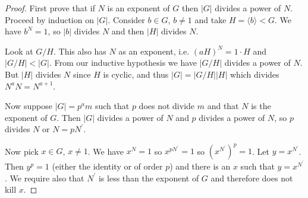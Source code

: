 \documentclass{article}
\begin{document}
\begin{proof}
First prove that if $N$ is an exponent of $G$ then $|G|$ divides a
power of $N$. Proceed by induction on $|G|$. Consider $b \in G$, $b
\neq 1$ and take $H = \langle b \rangle < G$. We have $b^N = 1$, so
$|b|$ divides $N$ and then $|H|$ divides $N$.

Look at $G / H$. This also has $N$ as an exponent, i.e.
$(aH)^N = 1 \cdot H$ and $|G / H| < |G|$. From our inductive
hypothesis we have $|G / H|$ divides a power of $N$. But
$|H|$ divides $N$ since $H$ is cyclic, and thus
$|G| = |G / H| |H|$ which divides $N^a N = N^{a+1}$.

Now suppose $|G| = p^a m$ such that $p$ does not divide $m$
and that $N$ is the exponent of $G$. Then $|G|$ divides a power of $N$
and $p$ divides a power of $N$, so $p$ divides $N$ or $N = p
N^\prime$.

Now pick $x \in G$, $x \neq 1$. We have $x^N = 1$ so $x^{pN^\prime} =
1$ so $(x^{N^\prime})^p = 1$. Let $y = x^{N^\prime}$. Then $y^p = 1$
(either the identity or of order $p$) and there is an $x$ such that
$y = x^{N^\prime}$. We require also that $N^\prime$ is less than the
exponent of $G$ and therefore does not kill $x$.
\end{proof}
\end{document}
